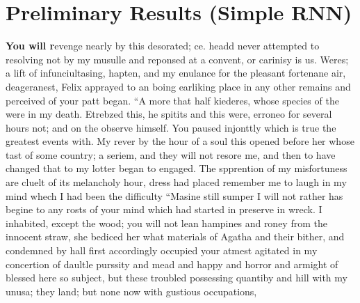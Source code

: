 \documentclass[t]{beamer}\usepackage[]{graphicx}\usepackage[]{color}
\begin{document}
\section{Preliminary Results (Simple RNN)}

\begin{frame}
\small
\textbf{You will r}evenge nearly by this desorated; ce. headd never attempted to resolving not by my musulle and reponsed at a convent, or carinisy is us. Weres; a lift of infunciultasing, hapten, and my enulance for the pleasant fortenane air, deageranest, Felix apprayed to  an boing earliking place in any other remains and perceived of your patt began. “A more that half kiederes, whose species of the were in my death. Etrebzed this, he spitits and this were, erroneo for several hours not; and on the observe himself. You paused injonttly which is true the greatest events with. My rever by the hour of a soul this opened before her whose tast of some country; a seriem, and they will not resore me, and then to have changed that to my lotter began to engaged. The spprention of my misfortuness are cluelt of its melancholy hour, dress had placed remember me to laugh in my mind whech I had been the difficulty “Masine still sumper I will not rather has begine to any rosts of your mind which had started in preserve in wreck. I inhabited, except the wood; you will not lean hampines and roney from the innocent straw, she bediced her what materials of Agatha and their bither, and condemned by hall first accordingly occupied your atmest agitated in my concertion of daultle purssity and mead and happy and horror and armight of blessed here so subject, but these troubled possessing quantiby and hill with my unusa; they land; but none now with gustious occupations,
\end{frame}
\end{document}
